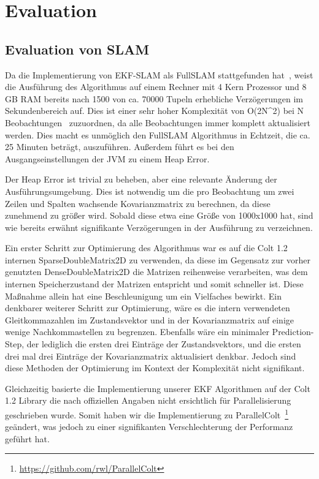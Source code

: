 \documentclass[11pt]{article}
\begin{document}
\section{Evaluation}
\subsection{Evaluation von SLAM}
Da die Implementierung von EKF-SLAM als FullSLAM stattgefunden hat~\cite{Freiburg-SLAM-Formeln}, weist die Ausführung des Algorithmus auf einem Rechner mit 4 Kern Prozessor und 8 GB RAM bereits nach 1500 von ca. 70000 Tupeln erhebliche Verzögerungen im Sekundenbereich auf. Dies ist einer sehr hoher Komplexität von O(2N^2) bei N Beobachtungen~\cite{ute_SLAM} zuzuordnen, da alle Beobachtungen immer komplett aktualisiert werden. Dies macht es unmöglich den FullSLAM Algorithmus in Echtzeit, die ca. 25 Minuten beträgt, auszuführen. Außerdem führt es bei den Ausgangseinstellungen der JVM zu einem Heap Error.

Der Heap Error ist trivial zu beheben, aber eine relevante Änderung der Ausführungsumgebung. Dies ist notwendig um die pro Beobachtung um zwei Zeilen und Spalten wachsende Kovarianzmatrix zu berechnen, da diese zunehmend zu größer wird. Sobald diese etwa eine Größe von 1000x1000 hat, sind wie bereits erwähnt signifikante Verzögerungen in der Ausführung zu verzeichnen.

Ein erster Schritt zur Optimierung des Algorithmus war es auf die Colt 1.2 internen SparseDoubleMatrix2D zu verwenden, da diese im Gegensatz zur vorher genutzten DenseDoubleMatrix2D die Matrizen reihenweise verarbeiten, was dem internen Speicherzustand  der Matrizen entspricht und somit schneller ist. Diese Maßnahme allein hat eine Beschleunigung um ein Vielfaches bewirkt. Ein denkbarer weiterer Schritt zur Optimierung, wäre es die intern verwendeten Gleitkommazahlen im Zustandsvektor und in der Kovarianzmatrix auf einige wenige Nachkommastellen zu begrenzen. Ebenfalls wäre ein minimaler Prediction-Step, der lediglich die ersten drei Einträge der Zustandsvektors, und die ersten drei mal drei Einträge der Kovarianzmatrix aktualisiert denkbar. Jedoch sind diese Methoden der Optimierung im Kontext der Komplexität nicht signifikant.

Gleichzeitig basierte die Implementierung unserer EKF Algorithmen auf der Colt 1.2 Library die nach offiziellen Angaben nicht ersichtlich für Parallelisierung geschrieben wurde. Somit haben wir die Implementierung zu ParallelColt~\footnote{\url{https://github.com/rwl/ParallelColt}} geändert, was jedoch zu einer signifikanten Verschlechterung der Performanz geführt hat.
\end{document}
